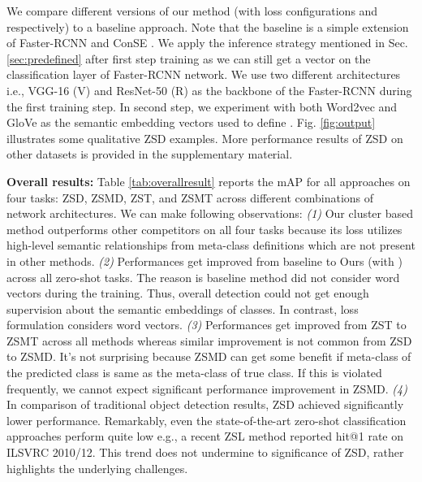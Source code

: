 \documentclass[runningheads]{llncs}
\begin{document}
We compare different versions of our method (with loss configurations  and  respectively) to a baseline approach. Note that the baseline is a simple extension of Faster-RCNN \cite{Faster_RCNN_2017} and ConSE \cite{norouzi_arXiv_2013}. We apply the inference strategy mentioned in Sec. \ref{sec:predefined} after first step training as we can still get a vector  on the classification layer of Faster-RCNN network. We use two different architectures i.e., VGG-16 (V) \cite{Vgg_arXiv_2014} and ResNet-50 (R) \cite{ResNet_CVPR_2016} as the backbone of the Faster-RCNN during the first training step. In second step, we experiment with both Word2vec and GloVe as the semantic embedding vectors used to define . Fig. \ref{fig:output} illustrates some qualitative ZSD examples. More performance results of ZSD on other datasets is provided in the supplementary material.

\textbf{Overall results:} Table \ref{tab:overallresult} reports the mAP for all approaches on four tasks: ZSD, ZSMD, ZST, and ZSMT across different combinations of network architectures. We can make following observations: \emph{(1)} Our cluster based method outperforms other competitors on all four tasks because its loss utilizes high-level semantic relationships from meta-class definitions which are not present in other methods.
\emph{(2)} Performances get improved from baseline to Ours (with ) across all zero-shot tasks. The reason is baseline method did not consider word vectors during the training. Thus, overall detection could not get enough supervision about the semantic embeddings of classes. In contrast,  loss formulation considers word vectors.
\emph{(3)} Performances get improved from ZST to ZSMT across all methods whereas similar improvement is not common from ZSD to ZSMD. It's not surprising because ZSMD can get some benefit if meta-class of the predicted class is same as the meta-class of true class. If this is violated frequently, we cannot expect significant performance improvement in ZSMD. 
\emph{(4)} In comparison of traditional object detection results, ZSD achieved significantly lower performance. Remarkably, even the state-of-the-art zero-shot classification approaches perform quite low e.g., a recent ZSL method \cite{Zhang_2017_CVPR} reported  hit@1 rate on ILSVRC 2010/12. This trend does not undermine to significance of ZSD, rather highlights the underlying challenges.
\end{document}
